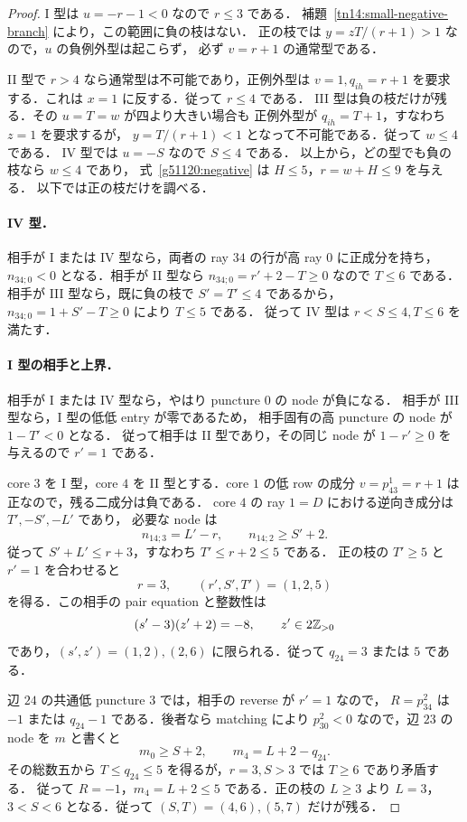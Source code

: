 \begin{proof}
I 型は $u=-r-1<0$ なので $r\le3$ である．
補題~\ref{tn14:small-negative-branch} により，この範囲に負の枝はない．
正の枝では $y=zT/(r+1)>1$ なので，$u$ の負例外型は起こらず，
必ず $v=r+1$ の通常型である．

II 型で $r>4$ なら通常型は不可能であり，正例外型は
$v=1,q_{ih}=r+1$ を要求する．これは $x=1$ に反する．従って $r\le4$ である．
III 型は負の枝だけが残る．その $u=T=w$ が四より大きい場合も
正例外型が $q_{ih}=T+1$，すなわち $z=1$ を要求するが，
$y=T/(r+1)<1$ となって不可能である．従って $w\le4$ である．
IV 型では $u=-S$ なので $S\le4$ である．
以上から，どの型でも負の枝なら $w\le4$ であり，
式~\eqref{g51120:negative} は $H\le5$，$r=w+H\le9$ を与える．
以下では正の枝だけを調べる．

\paragraph{IV 型．}
相手が I または IV 型なら，両者の ray $34$ の行が高 ray $0$ に正成分を持ち，
$n_{34;0}<0$ となる．相手が II 型なら
$n_{34;0}=r'+2-T\ge0$ なので $T\le6$ である．
相手が III 型なら，既に負の枝で $S'=T'\le4$ であるから，
$n_{34;0}=1+S'-T\ge0$ により $T\le5$ である．
従って IV 型は $r<S\le4,T\le6$ を満たす．

\paragraph{I 型の相手と上界．}
相手が I または IV 型なら，やはり puncture $0$ の node が負になる．
相手が III 型なら，I 型の低低 entry が零であるため，
相手固有の高 puncture の node が $1-T'<0$ となる．
従って相手は II 型であり，その同じ node が $1-r'\ge0$ を与えるので $r'=1$ である．

core $3$ を I 型，core $4$ を II 型とする．core $1$ の低 row の成分
$v=p^1_{43}=r+1$ は正なので，残る二成分は負である．
core $4$ の ray $1=D$ における逆向き成分は $T',-S',-L'$ であり，
必要な node は
\[
 n_{14;3}=L'-r,\qquad n_{14;2}\ge S'+2.
\]
従って $S'+L'\le r+3$，すなわち $T'\le r+2\le5$ である．
正の枝の $T'\ge5$ と $r'=1$ を合わせると
\[
 r=3,\qquad (r',S',T')=(1,2,5)
\]
を得る．この相手の pair equation と整数性は
\[
 (s'-3)(z'+2)=-8,\qquad z'\in2\mathbb Z_{>0}
\]
であり，$(s',z')=(1,2),(2,6)$ に限られる．従って $q_{24}=3$ または $5$ である．

辺 $24$ の共通低 puncture $3$ では，相手の reverse が $r'=1$ なので，
$R=p^2_{34}$ は $-1$ または $q_{24}-1$ である．後者なら matching により
$p^2_{30}<0$ なので，辺 $23$ の node を $m$ と書くと
\[
 m_0\ge S+2,\qquad m_4=L+2-q_{24}.
\]
その総数五から $T\le q_{24}\le5$ を得るが，$r=3,S>3$ では $T\ge6$ であり矛盾する．
従って $R=-1$，$m_4=L+2\le5$ である．正の枝の $L\ge3$ より
$L=3$，$3<S<6$ となる．従って $(S,T)=(4,6),(5,7)$ だけが残る．


\end{proof}
